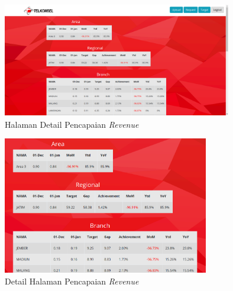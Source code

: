 \begin{figure}[h!]
	\centerline
	{\includegraphics[width=10cm,height=5cm]{bab5/tampilanDetailPencapaian.png}}
	\caption{Halaman Detail Pencapaian \textit{Revenue}}
	\label{figure:pencapaianTPORT}
\end{figure}

\begin{figure}[h!]
	\centerline
	{\includegraphics[width=9cm,height=6cm]{bab5/detailTampilanPencapaian.png}}
	\caption{Detail Halaman Pencapaian \textit{Revenue}}
	\label{figure:detailPencapaianTPORT}
\end{figure}


